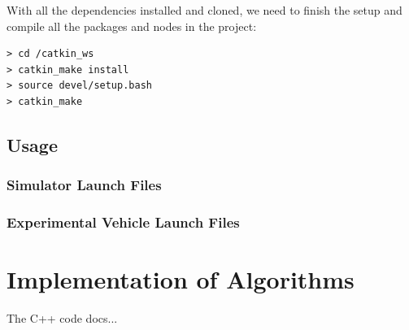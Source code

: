 With all the dependencies installed and cloned, we need to finish the setup and compile all the packages and nodes in the project:

\begin{Verbatim}[fontsize=\small]
> cd /catkin_ws
> catkin_make install
> source devel/setup.bash
> catkin_make
\end{Verbatim}

\subsection{Usage}

\subsubsection{Simulator Launch Files}

\subsubsection{Experimental Vehicle Launch Files}

\section{Implementation of Algorithms}

The C++ code docs...